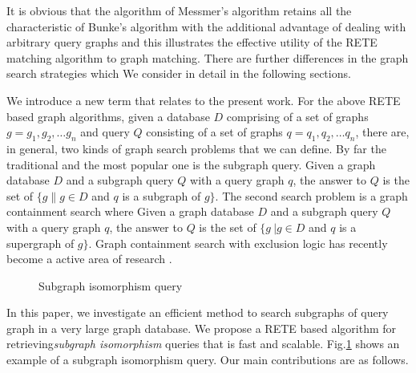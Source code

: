 It is obvious that the algorithm of Messmer's algorithm retains all the characteristic of Bunke's algorithm  with the additional advantage of dealing with arbitrary query graphs and this illustrates the effective utility of the RETE matching algorithm to graph matching. There are further differences in the graph search strategies which We consider in detail in the following sections.


We introduce a new term that relates to the present work. For the above RETE based graph algorithms, given a database $D$ comprising of a set of graphs $g=g_{1} ,g_{2} ,\ldots g_{n}$ and query $Q$ consisting of a set of graphs $q=q_{1} ,q_{2} ,\ldots q_{n}$, there are, in general, two kinds of graph search problems that we can define. By far the traditional and the most popular one is the subgraph query. Given a graph database $D$ and a subgraph query $Q$ with  a query graph $q$, the answer to $Q$ is the set of $\{g \| g\in D$ 
and $q$ is a subgraph of $g\} $. The second search problem is a graph containment search where Given a graph database $D$ and a subgraph query $Q$ with  
a query graph $q$, the answer to $Q$ is the set of $\{g\ | g\in D$ and $q$ is a supergraph of $g\}$. Graph containment search with exclusion logic has 
recently become a  active area of research \cite{chen2007_cindex} \cite{zhang_gao_wu2011}.  
 

\begin{figure}
\centering

\caption{Subgraph isomorphism query}
\label{fig:fig11}
\end{figure}


In this paper, we investigate an efficient method to search subgraphs of query graph in a very large graph database. We propose a RETE based algorithm for retrieving\textit{subgraph isomorphism} queries that is fast and scalable. Fig.\ref{fig:fig11} shows an example of a subgraph isomorphism query. 
Our main contributions are as follows.


